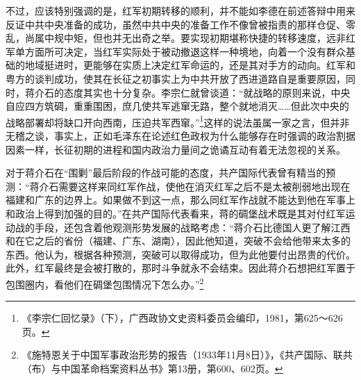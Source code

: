 不过，应该特别强调的是，红军初期转移的顺利，并不能如李德在前述答辩中用来反证中共中央准备的成功，虽然中共中央的准备工作不像曾被指责的那样仓促、零乱，尚属中规中矩，但也并无出奇之举。要实现初期堪称快捷的转移速度，远非红军单方面所可决定，当红军实际处于被动撤退这样一种境地，向着一个没有群众基础的地域挺进时，更能够在实质上决定红军命运的，还是其对手方的动向。红军和粤方的谈判成功，使其在长征之初事实上为中共开放了西进道路自是重要原因，同时，蒋介石的态度其实也十分复杂。李宗仁就曾谈道：“就战略的原则来说，中央自应四方筑碉，重重围困，庶几使共军逃窜无路，整个就地消灭……但此次中央的战略部署却将缺口开向西南，压迫共军西窜。”\footnote{《李宗仁回忆录》（下），广西政协文史资料委员会编印，1981，第625～626页。}这样的说法虽属一家之言，但并非无稽之谈，事实上，正如毛泽东在论述红色政权为什么能够存在时强调的政治割据因素一样，长征初期的进程和国内政治力量间之诡谲互动有着无法忽视的关系。


对于蒋介石在“围剿”最后阶段的作战可能的态度，共产国际代表曾有精当的预测：“蒋介石需要这样来同红军作战，使他在消灭红军之后不是太被削弱地出现在福建和广东的边界上。如果做不到这一点，那么同红军作战就不能达到他在军事上和政治上得到加强的目的。”在共产国际代表看来，蒋的碉堡战术既是其对付红军运动战的手段，还包含着他观测形势发展的战略考虑：“蒋介石比德国人更了解江西和在它之后的省份（福建、广东、湖南），因此他知道，突破不会给他带来太多的东西。他认为，根据各种预测，突破可以取得成功，但为此他要付出昂贵的代价。此外，红军最终是会被打散的，那时斗争就永不会结束。因此蒋介石想把红军置于包围圈内，看他们在碉堡包围情况下怎么办。”\footnote{《施特恩关于中国军事政治形势的报告（1933年11月8日）》，《共产国际、联共（布）与中国革命档案资料丛书》第13册，第600、602页。}


